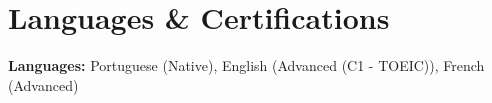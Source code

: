 \documentclass[10pt,a4paper]{article}
\begin{document}
\section{Languages \& Certifications}
\small
\noindent\textbf{Languages:}
Portuguese (Native), English (Advanced (C1 - TOEIC)), French (Advanced)\\[1.5pt]
\end{document}
